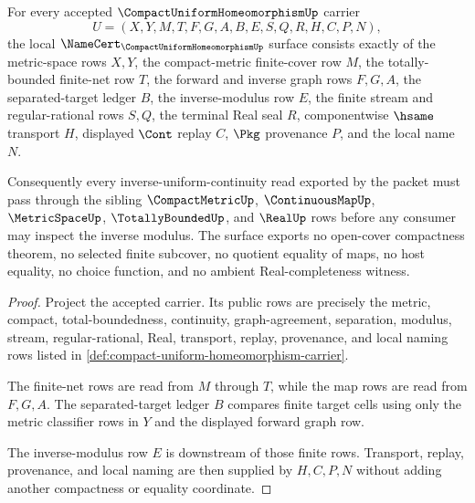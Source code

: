 \begin{theorem}\label{thm:compact-uniform-homeomorphism-namecert-surface}
For every accepted $\CompactUniformHomeomorphismUp$ carrier
$$
U=(X,Y,M,T,F,G,A,B,E,S,Q,R,H,C,P,N),
$$
the local $\NameCert_{\CompactUniformHomeomorphismUp}$ surface consists exactly of the metric-space rows $X,Y$, the compact-metric finite-cover row $M$, the totally-bounded finite-net row $T$, the forward and inverse graph rows $F,G,A$, the separated-target ledger $B$, the inverse-modulus row $E$, the finite stream and regular-rational rows $S,Q$, the terminal Real seal $R$, componentwise $\hsame$ transport $H$, displayed $\Cont$ replay $C$, $\Pkg$ provenance $P$, and the local name $N$.

Consequently every inverse-uniform-continuity read exported by the packet must pass through the sibling $\CompactMetricUp$, $\ContinuousMapUp$, $\MetricSpaceUp$, $\TotallyBoundedUp$, and $\RealUp$ rows before any consumer may inspect the inverse modulus. The surface exports no open-cover compactness theorem, no selected finite subcover, no quotient equality of maps, no host equality, no choice function, and no ambient Real-completeness witness.
\end{theorem}
\begin{proof}
Project the accepted carrier. Its public rows are precisely the metric, compact, total-boundedness, continuity, graph-agreement, separation, modulus, stream, regular-rational, Real, transport, replay, provenance, and local naming rows listed in \autoref{def:compact-uniform-homeomorphism-carrier}.

The finite-net rows are read from $M$ through $T$, while the map rows are read from $F,G,A$. The separated-target ledger $B$ compares finite target cells using only the metric classifier rows in $Y$ and the displayed forward graph row.

The inverse-modulus row $E$ is downstream of those finite rows. Transport, replay, provenance, and local naming are then supplied by $H,C,P,N$ without adding another compactness or equality coordinate.
\end{proof}

